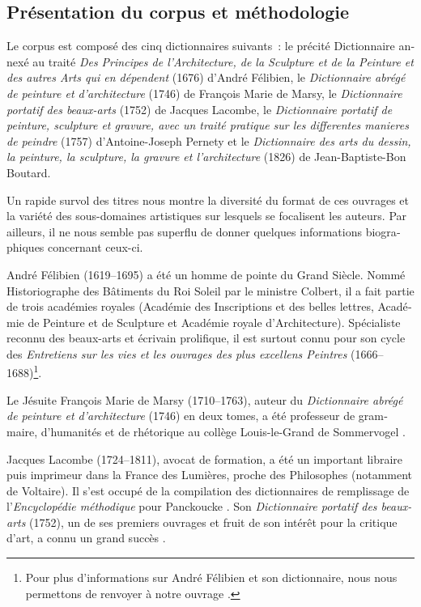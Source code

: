\documentclass[output=paper,colorlinks,citecolor=brown,arabicfont,chinesefont,booklanguage=french]{langscibook}
\begin{document}
\begin{otherlanguage}{french}
\section{Présentation du corpus et méthodologie}
\largerpage
Le corpus est composé des cinq dictionnaires suivants~: le précité Dictionnaire annexé au traité \emph{Des Principes de l’Architecture, de la Sculpture et de la Peinture et des autres Arts qui en dépendent} (1676) d’André Félibien, le \emph{Dictionnaire abrégé de peinture et d’architecture} (1746) de François Marie de Marsy, le \emph{Dictionnaire portatif des beaux-arts} (1752) de Jacques Lacombe, le \emph{Dictionnaire portatif de peinture, sculpture et gravure, avec un traité pratique sur les differentes manieres de peindre} (1757) d’Antoine-Joseph Pernety et le \emph{Dictionnaire des arts du dessin, la peinture, la sculpture, la gravure et l’architecture} (1826) de Jean-Baptiste-Bon Boutard. 

Un rapide survol des titres nous montre la diversité du format de ces ouvrages et la variété des sous-domaines artistiques sur lesquels se focalisent les auteurs. Par ailleurs, il ne nous semble pas superflu de donner quelques informations biographiques concernant ceux-ci. 

André Félibien (1619--1695) a été un homme de pointe du Grand Siècle. Nommé Historiographe des Bâtiments du Roi Soleil par le ministre Colbert, il a fait partie de trois académies royales (Académie des Inscriptions et des belles lettres, Académie de Peinture et de Sculpture et Académie royale d’Architecture). Spécialiste reconnu des beaux-arts et écrivain prolifique, il est surtout connu pour son cycle des \emph{Entretiens sur les vies et les ouvrages des plus excellens Peintres} (1666--1688)\footnote{Pour plus d’informations sur André Félibien et son dictionnaire, nous nous permettons de renvoyer à notre ouvrage \citep{Cetro2022}.}.

Le Jésuite François Marie de Marsy (1710--1763), auteur du \emph{Dictionnaire abrégé de peinture et d’architecture} (1746) en deux tomes, a été professeur de grammaire, d’humanités et de rhétorique au collège Louis-le-Grand de Sommervogel \citep[690]{Sgard1999}.

Jacques Lacombe (1724--1811), avocat de formation, a été un important libraire puis imprimeur dans la France des Lumières, proche des Philosophes (notamment de Voltaire). Il s’est occupé de la compilation des dictionnaires de remplissage de l’\emph{Encyclopédie méthodique} pour Panckoucke \citep[188]{MartinChartier1984}.  Son \emph{Dictionnaire portatif des beaux-arts} (1752), un de ses premiers ouvrages et fruit de son intérêt pour la critique d’art, a connu un grand succès \citep[550--551]{Sgard1999}.


\end{otherlanguage}
\end{document}
